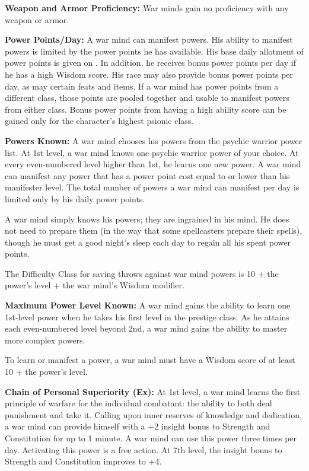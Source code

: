 {
\textbf{Weapon and Armor Proficiency:} War minds gain no proficiency with any weapon or armor.

\textbf{Power Points/Day:} A war mind can manifest powers. His ability to manifest powers is limited by the power points he has available. His base daily allotment of power points is given on . In addition, he receives bonus power points per day if he has a high Wisdom score. His race may also provide bonus power points per day, as may certain feats and items. If a war mind has power points from a different class, those points are pooled together and usable to manifest powers from either class. Bonus power points from having a high ability score can be gained only for the character’s highest psionic class.

\textbf{Powers Known:} A war mind chooses his powers from the psychic warrior power list. At 1st level, a war mind knows one psychic warrior power of your choice. At every even-numbered level higher than 1st, he learns one new power. A war mind can manifest any power that has a power point cost equal to or lower than his manifester level. The total number of powers a war mind can manifest per day is limited only by his daily power points.

A war mind simply knows his powers; they are ingrained in his mind. He does not need to prepare them (in the way that some spellcasters prepare their spells), though he must get a good night’s sleep each day to regain all his spent power points.

The Difficulty Class for saving throws against war mind powers is 10 + the power’s level + the war mind’s Wisdom modifier.

\textbf{Maximum Power Level Known:} A war mind gains the ability to learn one 1st-level power when he takes his first level in the prestige class. As he attains each even-numbered level beyond 2nd, a war mind gains the ability to master more complex powers.

To learn or manifest a power, a war mind must have a Wisdom score of at least 10 + the power’s level.

\textbf{Chain of Personal Superiority (Ex):} At 1st level, a war mind learns the first principle of warfare for the individual combatant: the ability to both deal punishment and take it. Calling upon inner reserves of knowledge and dedication, a war mind can provide himself with a +2 insight bonus to Strength and Constitution for up to 1 minute. A war mind can use this power three times per day. Activating this power is a free action. At 7th level, the insight bonus to Strength and Constitution improves to +4.

}
